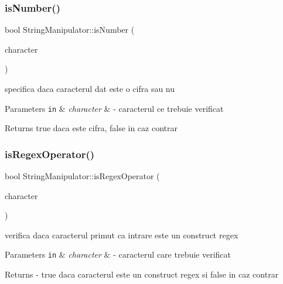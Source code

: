 \subsubsection{\texorpdfstring{is\+Number()}{isNumber()}}
{\footnotesize\ttfamily bool String\+Manipulator\+::is\+Number (\begin{DoxyParamCaption}\item[{const Q\+Char \&}]{character }\end{DoxyParamCaption})\hspace{0.3cm}{\ttfamily [static]}}

specifica daca caracterul dat este o cifra sau nu


\begin{DoxyParams}[1]{Parameters}
\mbox{\tt in}  & {\em character} & -\/ caracterul ce trebuie verificat\\
\hline
\end{DoxyParams}
\begin{DoxyReturn}{Returns}
true daca este cifra, false in caz contrar 
\end{DoxyReturn}
\mbox{\label{class_string_manipulator_a51dc44388aac908904aa0408e73ab615}} 
\subsubsection{\texorpdfstring{is\+Regex\+Operator()}{isRegexOperator()}}
{\footnotesize\ttfamily bool String\+Manipulator\+::is\+Regex\+Operator (\begin{DoxyParamCaption}\item[{const Q\+Char \&}]{character }\end{DoxyParamCaption})\hspace{0.3cm}{\ttfamily [static]}}

verifica daca caracterul primut ca intrare este un construct regex


\begin{DoxyParams}[1]{Parameters}
\mbox{\tt in}  & {\em character} & -\/ caracterul care trebuie verificat\\
\hline
\end{DoxyParams}
\begin{DoxyReturn}{Returns}
-\/ true daca caracterul este un construct regex si false in caz contrar 
\end{DoxyReturn}
\mbox{\label{class_string_manipulator_a102944c73c7fc265e426bc7749907e8c}} 
